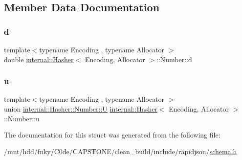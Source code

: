 \subsection{Member Data Documentation}
\mbox{\label{structinternal_1_1Hasher_1_1Number_a2ccd7098c4c22f893351670f2b09176d}} 
\subsubsection{\texorpdfstring{d}{d}}
{\footnotesize\ttfamily template$<$typename Encoding , typename Allocator $>$ \\
double \hyperlink{classinternal_1_1Hasher}{internal\+::\+Hasher}$<$ Encoding, Allocator $>$\+::Number\+::d}

\mbox{\label{structinternal_1_1Hasher_1_1Number_a71c1a3256604ddd4316e2cea72b8308f}} 
\subsubsection{\texorpdfstring{u}{u}}
{\footnotesize\ttfamily template$<$typename Encoding , typename Allocator $>$ \\
union \hyperlink{unioninternal_1_1Hasher_1_1Number_1_1U}{internal\+::\+Hasher\+::\+Number\+::U} \hyperlink{classinternal_1_1Hasher}{internal\+::\+Hasher}$<$ Encoding, Allocator $>$\+::Number\+::u}



The documentation for this struct was generated from the following file\+:\begin{DoxyCompactItemize}
\item 
/mnt/hdd/fnky/\+C0de/\+C\+A\+P\+S\+T\+O\+N\+E/clean\+\_\+build/include/rapidjson/\hyperlink{schema_8h}{schema.\+h}\end{DoxyCompactItemize}
